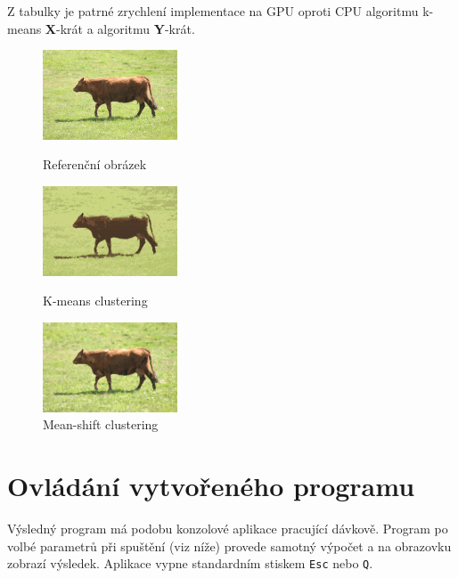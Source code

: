 \documentclass[11pt,a4paper]{article}
\begin{document}
Z tabulky je patrné zrychlení implementace na GPU oproti CPU algoritmu k-means \textbf{X}-krát a algoritmu \textbf{Y}-krát.

\begin{figure}[ht]
        \begin{center}
            \includegraphics[width=4cm,keepaspectratio]{images/img.pdf}
        \end{center}
        \caption{Referenční obrázek}
    \endminipage
    \hfill
        \begin{center}
            \includegraphics[width=4cm,keepaspectratio]{images/km.pdf}
        \end{center}
        \caption{K-means clustering}
    \endminipage
    \hfill
        \begin{center}
            \includegraphics[width=4cm,keepaspectratio]{images/ms.pdf}
        \end{center}
        \caption{Mean-shift clustering}
    \endminipage
\end{figure}


\section{Ovládání vytvořeného programu}
Výsledný program má podobu konzolové aplikace pracující dávkově. Program po volbé parametrů při spuštění (viz níže) provede samotný výpočet a na obrazovku zobrazí výsledek. Aplikace vypne standardním stiskem \texttt{Esc} nebo \texttt{Q}.
\end{document}
